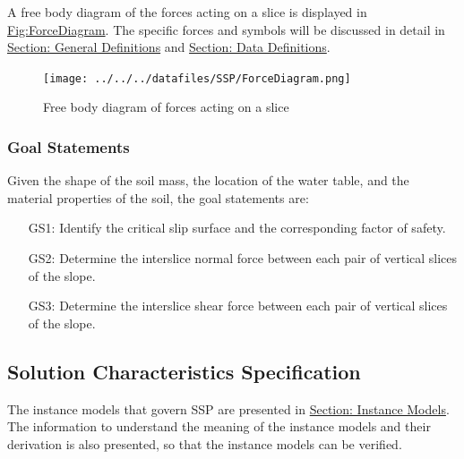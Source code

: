 \documentclass[12pt]{article}
\begin{document}
A free body diagram of the forces acting on a slice is displayed in \hyperref[Figure:ForceDiagram]{Fig:ForceDiagram}. The specific forces and symbols will be discussed in detail in \hyperref[Sec:GDs]{Section: General Definitions} and \hyperref[Sec:DDs]{Section: Data Definitions}.
\begin{figure}
\begin{center}
\texttt{[image: ../../../datafiles/SSP/ForceDiagram.png]}
\caption{Free body diagram of forces acting on a slice}
\label{Figure:ForceDiagram}
\end{center}
\end{figure}
\subsubsection{Goal Statements}
\label{Sec:GoalStmt}
Given the shape of the soil mass, the location of the water table, and the material properties of the soil, the goal statements are:
\begin{itemize}
\item[GS1:]Identify the critical slip surface and the corresponding factor of safety.
\item[GS2:]Determine the interslice normal force between each pair of vertical slices of the slope.
\item[GS3:]Determine the interslice shear force between each pair of vertical slices of the slope.
\end{itemize}
\subsection{Solution Characteristics Specification}
\label{Sec:SolCharSpec}
The instance models that govern SSP are presented in \hyperref[Sec:IMs]{Section: Instance Models}. The information to understand the meaning of the instance models and their derivation is also presented, so that the instance models can be verified.
\end{document}
